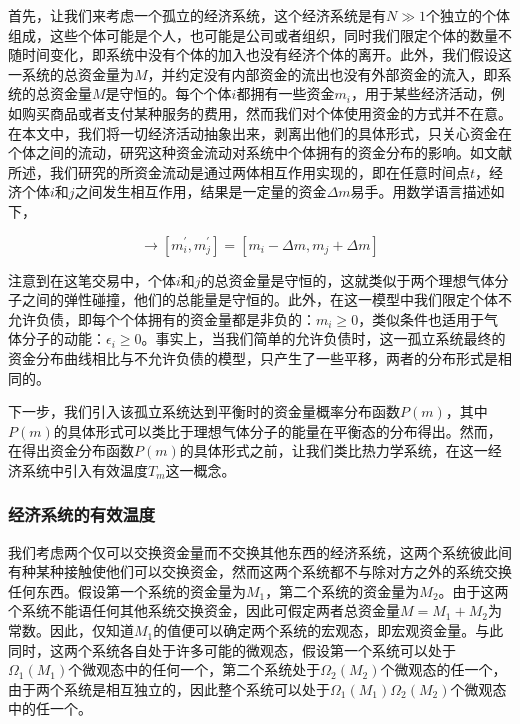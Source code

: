 \documentclass[tsinghuacite]{HustGraduPaper}
\begin{document}
			首先，让我们来考虑一个孤立的经济系统，这个经济系统是有$N \gg 1$个独立的个体组成，这些个体可能是个人，也可能是公司或者组织，同时我们限定个体的数量不随时间变化，即系统中没有个体的加入也没有经济个体的离开。此外，我们假设这一系统的总资金量为$M$，并约定没有内部资金的流出也没有外部资金的流入，即系统的总资金量$M$是守恒的。每个个体$i$都拥有一些资金$m_i$，用于某些经济活动，例如购买商品或者支付某种服务的费用，然而我们对个体使用资金的方式并不在意。在本文中，我们将一切经济活动抽象出来，剥离出他们的具体形式，只关心资金在个体之间的流动，研究这种资金流动对系统中个体拥有的资金分布的影响。如文献\cite{ispolatov1998wealth}所述，我们研究的所资金流动是通过两体相互作用实现的，即在任意时间点$t$，经济个体$i$和$j$之间发生相互作用，结果是一定量的资金$\Delta m$易手。用数学语言描述如下，
		
			\begin{equation}
				[m_i, m_j] \rightarrow [m_{i}^{'}, m_{j}^{'}] = [m_i - \Delta m, m_j + \Delta m]   \label{eq6}
			\end{equation}
			
			\vspace{1.5em}  
			
			注意到在这笔交易中，个体$i$和$j$的总资金量是守恒的，这就类似于两个理想气体分子之间的弹性碰撞，他们的总能量是守恒的。此外，在这一模型中我们限定个体不允许负债，即每个个体拥有的资金量都是非负的：$m_i \geq 0$，类似条件也适用于气体分子的动能：$\epsilon_i \geq 0$。事实上，当我们简单的允许负债时，这一孤立系统最终的资金分布曲线相比与不允许负债的模型，只产生了一些平移，两者的分布形式是相同的\cite{dragulescu2000statistical}。
			
			下一步，我们引入该孤立系统达到平衡时的资金量概率分布函数$P(m)$，其中$P(m)$的具体形式可以类比于理想气体分子的能量在平衡态的分布得出\cite{wannier1987statistical}。然而，在得出资金分布函数$P(m)$的具体形式之前，让我们类比热力学系统，在这一经济系统中引入有效温度$T_m$这一概念。
			
			
			\subsubsection{经济系统的有效温度}
			
			我们考虑两个仅可以交换资金量而不交换其他东西的经济系统，这两个系统彼此间有种某种接触使他们可以交换资金，然而这两个系统都不与除对方之外的系统交换任何东西。假设第一个系统的资金量为$M_1$，第二个系统的资金量为$M_2$。由于这两个系统不能语任何其他系统交换资金，因此可假定两者总资金量$M = M_1 + M_2$为常数。因此，仅知道$M_1$的值便可以确定两个系统的宏观态，即宏观资金量。与此同时，这两个系统各自处于许多可能的微观态，假设第一个系统可以处于$\Omega_1 (M_1)$个微观态中的任何一个，第二个系统处于$\Omega_2 (M_2)$个微观态的任一个，由于两个系统是相互独立的，因此整个系统可以处于$\Omega_1 (M_1) \Omega_2 (M_2)$个微观态中的任一个。
			
\end{document}
